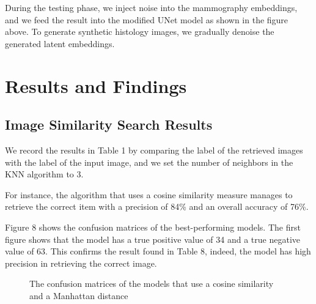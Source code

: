 \documentclass[11pt]{article}
\begin{document}
During the testing phase, we inject noise into the mammography embeddings, and we feed the result into the modified UNet model as shown in the figure above. To generate synthetic histology images, we gradually denoise the generated latent embeddings. 
\section{Results and Findings}
\subsection{Image Similarity Search Results}


We record the results in Table 1 by comparing the label of the retrieved images with the label of the input image, and we set the number of neighbors in the KNN algorithm to 3.

\begin{table}[h!]
    \caption{ The recorded metrics using different similarity measures }
  \centering
  
  \label{table:1}
\end{table}

For instance, the algorithm that uses a cosine similarity measure manages to retrieve the correct item with a precision of 84\% and an overall accuracy of 76\%. 

Figure 8 shows the confusion matrices of the best-performing models. The first figure shows that the model has a true positive value of 34 and a true negative value of 63. This confirms the result found in Table 8, indeed, the model has high precision in retrieving the correct image. 

\begin{figure}[!h]
  \centering
  \quad  
  \caption{The confusion matrices of the models that use a cosine similarity and a Manhattan distance }
\end{figure}
\end{document}
